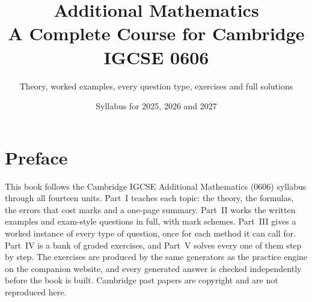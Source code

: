 \documentclass[11pt,a4paper,openany]{book}
\title{\Huge\bfseries Additional Mathematics\\[6pt]\Large A Complete Course for Cambridge IGCSE 0606}
\author{Theory, worked examples, every question type, exercises and full solutions}
\date{Syllabus for 2025, 2026 and 2027}
\theoremstyle{definition}
\begin{document}
\frontmatter
\maketitle
\chapter*{Preface}
This book follows the Cambridge IGCSE Additional Mathematics (0606) syllabus through all fourteen units.
Part~I teaches each topic: the theory, the formulas, the errors that cost marks and a one-page summary.
Part~II works the written examples and exam-style questions in full, with mark schemes.
Part~III gives a worked instance of every type of question, once for each method it can call for.
Part~IV is a bank of graded exercises, and Part~V solves every one of them step by step.
The exercises are produced by the same generators as the practice engine on the companion website,
and every generated answer is checked independently before the book is built.
Cambridge past papers are copyright and are not reproduced here.
\tableofcontents
\mainmatter






\end{document}
